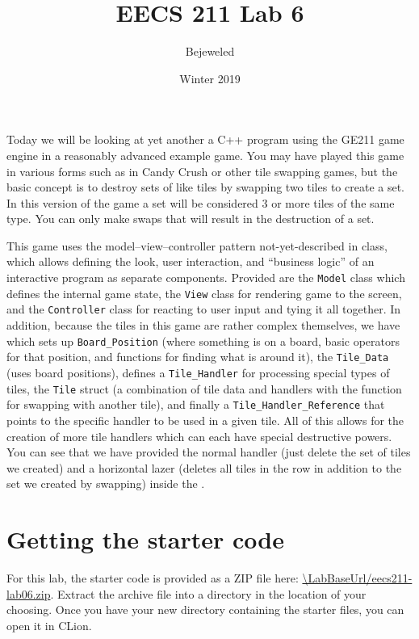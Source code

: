 \documentclass{tufte-handout}
\title{EECS 211 Lab 6}
\author{Bejeweled}
\date{Winter 2019}
\def\ThisLabBase{eecs211-lab06}
\def\ThisLabUrl{\LabBaseUrl/\ThisLabBase.zip}
\begin{document}
\maketitle

Today we will be looking at yet another a C++ program using the GE211 game
engine in a reasonably advanced example game. You may have played this game
in various forms such as in Candy Crush or other tile swapping games, but the
basic concept is to destroy sets of like tiles by swapping two tiles to
create a set. In this version of the game a set will be considered 3 or more
tiles of the same type. You can only make swaps that will result in the
destruction of a set.

This game uses the model--view--controller pattern not-yet-described in
class, which allows defining the look, user interaction, and ``business
logic'' of an interactive program as separate components. Provided are
the \texttt{Model} class which defines the internal game state, the
\texttt{View} class for rendering game to the screen, and the
\texttt{Controller} class for reacting to user input and tying it all
together. In addition, because the tiles in this game are rather complex
themselves, we have  which sets up \texttt{Board\_Position}
(where something is on a board, basic operators for that position, and
functions for finding what is around it), the \texttt{Tile\_Data} (uses board
positions), defines a \texttt{Tile\_Handler} for processing special types of
tiles, the \texttt{Tile} struct (a combination of tile data and handlers with
the function for swapping with another tile), and finally a
\texttt{Tile\_Handler\_Reference} that points to the specific handler to be
used in a given tile. All of this allows for the creation of more tile handlers
which can each have special destructive powers. You can see that we have provided
the normal handler (just delete the set of tiles we created) and a horizontal
lazer (deletes all tiles in the row in addition to the set we created by swapping)
inside the .

\section{Getting the starter code}

For this lab, the starter code is provided as a ZIP file here:
\url{\ThisLabUrl}. Extract the archive file into a directory in the
location of your choosing. Once you have your new directory containing
the starter files, you can open it in CLion.
\end{document}

